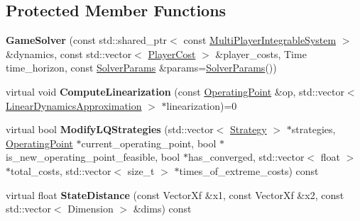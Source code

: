 \subsection*{Protected Member Functions}
\begin{DoxyCompactItemize}
\item 
{\bfseries Game\+Solver} (const std\+::shared\+\_\+ptr$<$ const \hyperlink{classilqgames_1_1_multi_player_integrable_system}{Multi\+Player\+Integrable\+System} $>$ \&dynamics, const std\+::vector$<$ \hyperlink{classilqgames_1_1_player_cost}{Player\+Cost} $>$ \&player\+\_\+costs, Time time\+\_\+horizon, const \hyperlink{structilqgames_1_1_solver_params}{Solver\+Params} \&params=\hyperlink{structilqgames_1_1_solver_params}{Solver\+Params}())\hypertarget{classilqgames_1_1_game_solver_a89a591bb5d9fcefc28157a54b016a4d1}{}\label{classilqgames_1_1_game_solver_a89a591bb5d9fcefc28157a54b016a4d1}

\item 
virtual void {\bfseries Compute\+Linearization} (const \hyperlink{structilqgames_1_1_operating_point}{Operating\+Point} \&op, std\+::vector$<$ \hyperlink{structilqgames_1_1_linear_dynamics_approximation}{Linear\+Dynamics\+Approximation} $>$ $\ast$linearization)=0\hypertarget{classilqgames_1_1_game_solver_a4a1772a9bd07347ed28455119b2571fe}{}\label{classilqgames_1_1_game_solver_a4a1772a9bd07347ed28455119b2571fe}

\item 
virtual bool {\bfseries Modify\+L\+Q\+Strategies} (std\+::vector$<$ \hyperlink{structilqgames_1_1_strategy}{Strategy} $>$ $\ast$strategies, \hyperlink{structilqgames_1_1_operating_point}{Operating\+Point} $\ast$current\+\_\+operating\+\_\+point, bool $\ast$is\+\_\+new\+\_\+operating\+\_\+point\+\_\+feasible, bool $\ast$has\+\_\+converged, std\+::vector$<$ float $>$ $\ast$total\+\_\+costs, std\+::vector$<$ size\+\_\+t $>$ $\ast$times\+\_\+of\+\_\+extreme\+\_\+costs) const \hypertarget{classilqgames_1_1_game_solver_adafbb2f48bbd4cfb9f44ac0a3ae6c8f2}{}\label{classilqgames_1_1_game_solver_adafbb2f48bbd4cfb9f44ac0a3ae6c8f2}

\item 
virtual float {\bfseries State\+Distance} (const Vector\+Xf \&x1, const Vector\+Xf \&x2, const std\+::vector$<$ Dimension $>$ \&dims) const \hypertarget{classilqgames_1_1_game_solver_a413329f89a63805c387e35a99b53ad73}{}\label{classilqgames_1_1_game_solver_a413329f89a63805c387e35a99b53ad73}


\end{DoxyCompactItemize}
